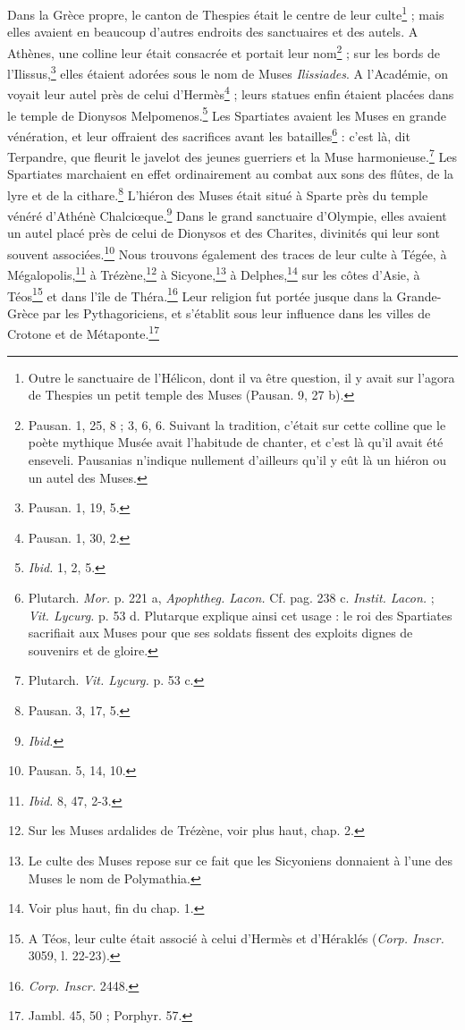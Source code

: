 \documentclass[a4paper, 11pt, oneside, polutonikogreek, french]{article}
\begin{document}
Dans la Grèce propre, le canton de Thespies était le centre de leur culte\footnote{Outre le sanctuaire de l'Hélicon, dont il va être question, il y avait sur l'agora de Thespies un petit temple des Muses (Pausan. 9, 27 b).} ; mais elles avaient en beaucoup d'autres endroits des sanctuaires et des autels. A Athènes, une colline leur était consacrée et portait leur nom\footnote{Pausan. 1, 25, 8 ; 3, 6, 6. Suivant la tradition, c'était sur cette colline que le poète mythique Musée avait l'habitude de chanter, et c'est là qu'il avait été enseveli. Pausanias n'indique nullement d'ailleurs qu'il y eût là un hiéron ou un autel des Muses.} ; sur les bords de l'Ilissus,\footnote{Pausan. 1, 19, 5.} elles étaient adorées sous le nom de Muses \emph{Ilissiades}. A l'Académie, on voyait leur autel près de celui d'Hermès\footnote{Pausan. 1, 30, 2.} ; leurs statues enfin étaient placées dans le temple de Dionysos Melpomenos.\footnote{\emph{Ibid.} 1, 2, 5.} Les Spartiates avaient les Muses en grande vénération, et leur offraient des sacrifices avant les batailles\footnote{Plutarch. \emph{Mor.} p. 221 a, \emph{Apophtheg. Lacon.} Cf. pag. 238 c. \emph{Instit. Lacon.} ; \emph{Vit. Lycurg.} p. 53 d. Plutarque explique ainsi cet usage : le roi des Spartiates sacrifiait aux Muses pour que ses soldats fissent des exploits dignes de souvenirs et de gloire.} : c'est là, dit Terpandre, que fleurit le javelot des jeunes guerriers et la Muse harmonieuse.\footnote{Plutarch. \emph{Vit. Lycurg.} p. 53 c.} Les Spartiates marchaient en effet ordinairement au combat aux sons des flûtes, de la lyre et de la cithare.\footnote{Pausan. 3, 17, 5.} L'hiéron des Muses était situé à Sparte près du temple vénéré d'Athénè Chalciœque.\footnote{\emph{Ibid.}} Dans le grand sanctuaire d'Olympie, elles avaient un autel placé près de celui de Dionysos et des Charites, divinités qui leur sont souvent associées.\footnote{Pausan. 5, 14, 10.} Nous trouvons également des traces de leur culte à Tégée, à Mégalopolis,\footnote{\emph{Ibid.} 8, 47, 2-3.} à Trézène,\footnote{Sur les Muses ardalides de Trézène, voir plus haut, chap. 2.} à Sicyone,\footnote{Le culte des Muses repose sur ce fait que les Sicyoniens donnaient à l'une des Muses le nom de Polymathia.} à Delphes,\footnote{Voir plus haut, fin du chap. 1.} sur les côtes d'Asie, à Téos\footnote{A Téos, leur culte était associé à celui d'Hermès et d'Héraklés (\emph{Corp. Inscr.} 3059, l. 22-23).} et dans l'île de Théra.\footnote{\emph{Corp. Inscr.} 2448.} Leur religion fut portée jusque dans la Grande-Grèce par les Pythagoriciens, et s'établit sous leur influence dans les villes de Crotone et de Métaponte.\footnote{Jambl. 45, 50 ; Porphyr. 57.}
\end{document}
